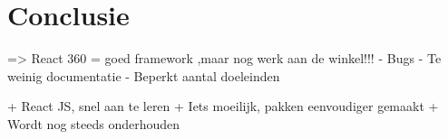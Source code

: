 
\chapter{Conclusie}
\label{ch:conclusie}


=> React 360 = goed framework ,maar nog werk aan de winkel!!!
- Bugs
- Te weinig documentatie
- Beperkt aantal doeleinden

+ React JS, snel aan te leren
+ Iets moeilijk, pakken eenvoudiger gemaakt
+ Wordt nog steeds onderhouden


